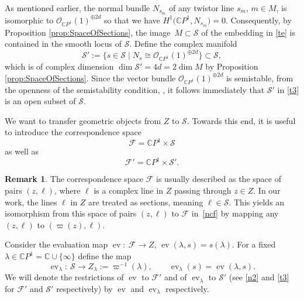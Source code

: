 \documentclass[pdftex]{sigma}
\numberwithin{equation}{section}
\theoremstyle{definition}
\newtheorem{Remark}[Theorem]{Remark}
\newcommand\C{{\mathbb C}}
\begin{document}
As mentioned earlier, the normal bundle $N_{s_m}$ of any twistor line $s_m$, $m \in M$, is isomorphic to
${\mathcal O}_{\C P^1}(1)^{\oplus 2d}$ so that we have $H^1\bigl(\C P^1, N_{s_m}\bigr) = 0$.
Consequently, by Proposition \ref{prop:SpaceOfSections}, the image~${M \subset \mathcal{S}}$ of the embedding in \eqref{te}
is contained in the smooth locus of $\mathcal S$. Define the complex manifold
\begin{equation}\label{t3}
{\mathcal S}' := \bigl\{s \in \mathcal S \mid N_s \cong
{\mathcal O}_{\C P^1}(1)^{\oplus 2d}\bigr\} \subset \mathcal S,
\end{equation}
which is of complex dimension $\dim{\mathcal S}' = 4d = 2\dim M$ by Proposition \ref{prop:SpaceOfSections}.
Since the vector bundle ${\mathcal O}_{\C P^1}(1)^{\oplus 2d}$ is semistable, from the openness
of the semistability condition, \cite[p.~635, Theorem 2.8\,(B)]{Maru}, it follows immediately
that ${\mathcal S}'$ in \eqref{t3} is an open subset of $\mathcal S$.

We want to transfer geometric objects from $Z$ to $\mathcal S$. Towards this end, it is useful to introduce
the correspondence space
\begin{equation}\label{ncf}
\mathcal F = \C P^1 \times \mathcal S
\end{equation}
as well as
\begin{equation}\label{n2}
\mathcal F' = \C P^1 \times \mathcal{S}'.
\end{equation}

\begin{Remark}
The correspondence space $\mathcal F$ is usually described as the space of pairs $(z, \ell)$, where $\ell$ is a complex
line in $Z$ passing through $z \in Z$.
In our work, the lines $\ell$ in $Z$ are treated as sections, meaning $\ell \in \mathcal{S}$.
 This yields an isomorphism
from this space of pairs $(z, \ell)$ to $\mathcal{F}$ in~\eqref{ncf} by mapping
any $(z, \ell)$ to $(\varpi(z), \ell)$.
\end{Remark}

Consider the evaluation map
$%
\operatorname{ev}\colon\ \mathcal F \longrightarrow Z $, $ \operatorname{ev}(\lambda , s) = s(\lambda) $.
For a fixed $\lambda \in \C P^1 = \C\cup\{\infty\}$ define the map
\begin{equation}\label{t5}
\operatorname{ev}_\lambda\colon \ {\mathcal S} \longrightarrow Z_\lambda := \varpi^{-1}(\lambda)
 ,\qquad \operatorname{ev}_\lambda(s) = \operatorname{ev}(\lambda, s) .
\end{equation}
We will denote the restrictions of $\operatorname{ev}$ to $\mathcal F'$ and of $\operatorname{ev}_\lambda$ to $\mathcal S'$
(see \eqref{n2} and \eqref{t3} for ${\mathcal F}'$ and ${\mathcal S}'$ respectively) by $\operatorname{ev}$ and
$\operatorname{ev}_\lambda$ respectively.
\end{document}
